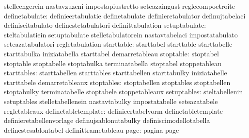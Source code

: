                                   stelleengerein                   nastavzuzeni
                                  impostapiustretto                seteazaingust
                                  reglecompoetroite
                  definetabulate: definieertabulatie               definetabulate
                                  definieretabulator               definujtabelaci
                                  definiscitabulato                definestetabulatori
                                  definittabulation
                   setuptabulate: steltabulatiein                  setuptabulate
                                  stelletabulatorein               nastavtabelaci
                                  impostatabulato                  seteazatabulatori
                                  regletabulation
                      starttable: starttabel                       starttable
                                  starttabelle                     starttabulka
                                  iniziatabella                    starttabel
                                  demarretableau
                       stoptable: stoptabel                        stoptable
                                  stoptabelle                      stoptabulka
                                  terminatabella                   stoptabel
                                  stoppetableau
                     starttables: starttabellen                    starttables
                                  starttabellen                    starttabulky
                                  iniziatabelle                    starttabele
                                  demarretableaux
                      stoptables: stoptabellen                     stoptables
                                  stoptabellen                     stoptabulky
                                  terminatabelle                   stoptabele
                                  stoppetableaux
                     setuptables: steltabellenin                   setuptables
                                  stelletabellenein                nastavtabulky
                                  impostatabelle                   seteazatabele
                                  regletableaux
             definetabletemplate: definieertabelvorm               definetabletemplate
                                  definieretabellenvorlage         definujsablonutabulky
                                  definiscimodellotabella          definestesablontabel
                                  definittrametableau
                            page: pagina                           page
